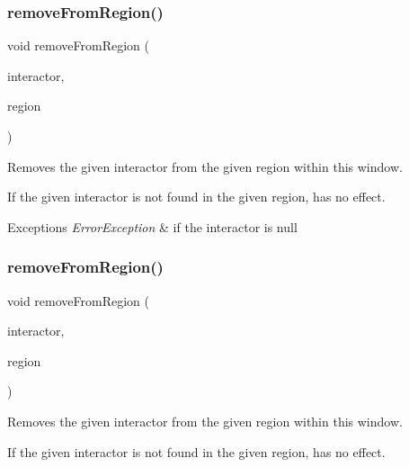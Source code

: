 \subsubsection{\texorpdfstring{remove\+From\+Region()}{removeFromRegion()}\hspace{0.1cm}{\footnotesize\ttfamily [2/4]}}
{\footnotesize\ttfamily void remove\+From\+Region (\begin{DoxyParamCaption}\item[{\mbox{\hyperlink{classGInteractor}{G\+Interactor}} $\ast$}]{interactor,  }\item[{const std\+::string \&}]{region }\end{DoxyParamCaption})\hspace{0.3cm}{\ttfamily [virtual]}}



Removes the given interactor from the given region within this window. 

If the given interactor is not found in the given region, has no effect. 
\begin{DoxyExceptions}{Exceptions}
{\em Error\+Exception} & if the interactor is null \\
\hline
\end{DoxyExceptions}
\mbox{\label{classGWindow_afee7b65f917c4f6a0fdb1c8ea75406a5}} 
\subsubsection{\texorpdfstring{remove\+From\+Region()}{removeFromRegion()}\hspace{0.1cm}{\footnotesize\ttfamily [3/4]}}
{\footnotesize\ttfamily void remove\+From\+Region (\begin{DoxyParamCaption}\item[{\mbox{\hyperlink{classGInteractor}{G\+Interactor}} \&}]{interactor,  }\item[{\mbox{\hyperlink{classGWindow_a81a01a86de31071a92e6cce0bab9bc4b}{Region}}}]{region }\end{DoxyParamCaption})\hspace{0.3cm}{\ttfamily [virtual]}}



Removes the given interactor from the given region within this window. 

If the given interactor is not found in the given region, has no effect. \mbox{\label{classGWindow_af7a055c83c0e0e3f3722596d7111fcbe}} 
